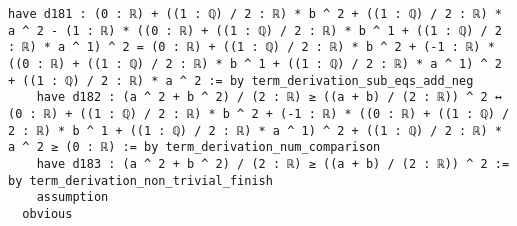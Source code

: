 \documentclass{article}
\begin{document}
\begin{tcolorbox}[colback=white!10, width=\linewidth]
\begin{lstlisting}[language=Lean4]
    have d181 : (0 : ℝ) + ((1 : ℚ) / 2 : ℝ) * b ^ 2 + ((1 : ℚ) / 2 : ℝ) * a ^ 2 - (1 : ℝ) * ((0 : ℝ) + ((1 : ℚ) / 2 : ℝ) * b ^ 1 + ((1 : ℚ) / 2 : ℝ) * a ^ 1) ^ 2 = (0 : ℝ) + ((1 : ℚ) / 2 : ℝ) * b ^ 2 + (-1 : ℝ) * ((0 : ℝ) + ((1 : ℚ) / 2 : ℝ) * b ^ 1 + ((1 : ℚ) / 2 : ℝ) * a ^ 1) ^ 2 + ((1 : ℚ) / 2 : ℝ) * a ^ 2 := by term_derivation_sub_eqs_add_neg
    have d182 : (a ^ 2 + b ^ 2) / (2 : ℝ) ≥ ((a + b) / (2 : ℝ)) ^ 2 ↔ (0 : ℝ) + ((1 : ℚ) / 2 : ℝ) * b ^ 2 + (-1 : ℝ) * ((0 : ℝ) + ((1 : ℚ) / 2 : ℝ) * b ^ 1 + ((1 : ℚ) / 2 : ℝ) * a ^ 1) ^ 2 + ((1 : ℚ) / 2 : ℝ) * a ^ 2 ≥ (0 : ℝ) := by term_derivation_num_comparison
    have d183 : (a ^ 2 + b ^ 2) / (2 : ℝ) ≥ ((a + b) / (2 : ℝ)) ^ 2 := by term_derivation_non_trivial_finish
    assumption
  obvious

\end{lstlisting}
\end{tcolorbox}
\end{document}
